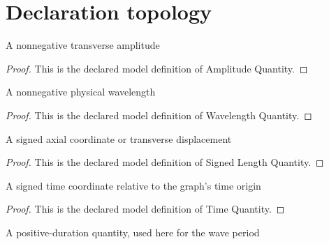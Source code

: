 \section{Declaration topology}
\begin{definition}
  \label{def:physics:phyx-mini-0290:phyxminiproblems-problemphyxmini0290-amplitudequantity}
  A nonnegative transverse amplitude
\end{definition}
\begin{proof}
  This is the declared model definition of Amplitude Quantity.
\end{proof}
\begin{definition}
  \label{def:physics:phyx-mini-0290:phyxminiproblems-problemphyxmini0290-wavelengthquantity}
  A nonnegative physical wavelength
\end{definition}
\begin{proof}
  This is the declared model definition of Wavelength Quantity.
\end{proof}
\begin{definition}
  \label{def:physics:phyx-mini-0290:phyxminiproblems-problemphyxmini0290-signedlengthquantity}
  A signed axial coordinate or transverse displacement
\end{definition}
\begin{proof}
  This is the declared model definition of Signed Length Quantity.
\end{proof}
\begin{definition}
  \label{def:physics:phyx-mini-0290:phyxminiproblems-problemphyxmini0290-timequantity}
  A signed time coordinate relative to the graph's time origin
\end{definition}
\begin{proof}
  This is the declared model definition of Time Quantity.
\end{proof}
\begin{definition}
  \label{def:physics:phyx-mini-0290:phyxminiproblems-problemphyxmini0290-durationquantity}
  A positive-duration quantity, used here for the wave period
\end{definition}
